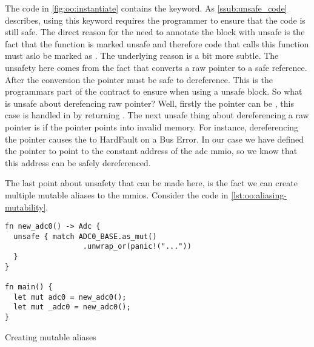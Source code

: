 The \rust code in \autoref{fig:oo:instantiate} contains the {\unsafe} keyword.
As \autoref{ssub:unsafe_code} describes, using this keyword requires the programmer to ensure that the code is still safe.
The direct reason for the need to annotate the block with unsafe is the fact that the function  is marked unsafe and therefore code that calls this function must aslo be marked as .
The underlying reason is a bit more subtle.
The unsafety here comes from the fact that  converts a raw pointer to a safe reference.
After the conversion the pointer must be safe to dereference.
This is the programmars part of the contract to ensure when using a unsafe block.
So what is unsafe about derefencing raw pointer?
Well, firstly the pointer can be , this case is handled in  by returning .
The next unsafe thing about dereferencing a raw pointer is if the pointer points into invalid memory.
For instance, dereferencing the pointer   causes the \gecko to HardFault on a Bus Error.
In our case we have defined the pointer to point to the constant address of the \gls{adc} \gls{mmio}, so we know that this address can be safely dereferenced.

The last point about unsafety that can be made here, is the fact we can create multiple mutable aliases to the \glspl{mmio}.
Consider the code in \autoref{lst:oo:aliasing-mutability}.

\begin{listing}[H]
  \begin{verbatim}
fn new_adc0() -> Adc {
  unsafe { match ADC0_BASE.as_mut()
                  .unwrap_or(panic!("..."))
  }
}

fn main() {
  let mut adc0 = new_adc0();
  let mut _adc0 = new_adc0();
}
  \end{verbatim}
  \caption{Creating mutable aliases}
  \label{lst:oo:aliasing-mutability}
\end{listing}
